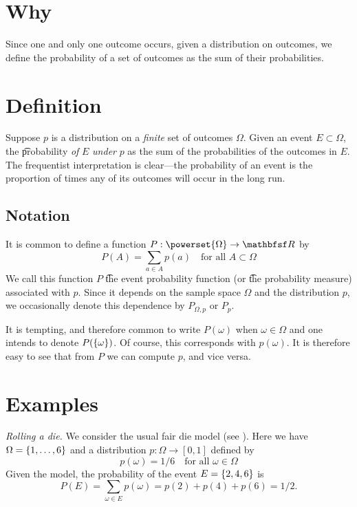 
\section*{Why}

Since one and only one outcome occurs, given a distribution on outcomes, we define the probability of a set of outcomes as the sum of their probabilities.

\section*{Definition}

Suppose $p$ is a distribution on a \textit{finite} set of outcomes $\Omega $.
Given an event $E \subset \Omega $, the \t{probability} \textit{of} $E$ \textit{under} $p$ as the sum of the probabilities of the outcomes in $E$.
The frequentist interpretation is clear---the probability of an event is the proportion of times any of its outcomes will occur in the long run.

\subsection*{Notation}

It is common to define a function $P: \powerset{\Omega } \to \R $ by
\[
P(A) = \sum_{a \in A} p(a) \quad \text{for all } A \subset \Omega
\]
We call this function $P$ \t{the event probability function} (or \t{the probability measure}) associated with $p$.
Since it depends on the sample space $\Omega $ and the distribution $p$, we occasionally denote this dependence by $P_{\Omega , p}$ or $P_p$.

It is tempting, and therefore common to write $P(\omega )$ when $\omega  \in \Omega $ and one intends to denote $P(\{\omega \})$.
Of course, this corresponds with $p(\omega )$.
It is therefore easy to see that from $P$ we can compute $p$, and vice versa.

\section*{Examples}

\textit{Rolling a die.}
We consider the usual fair die model (see ).
Here we have $\Omega  = \{1, \dots , 6\}$ and a distribution $p: \Omega  \to [0,1]$ defined by
\[
p(\omega ) = 1/6 \quad \text{for all } \omega  \in \Omega
\]
Given the model, the probability of the event $E = \{2, 4, 6\}$ is
\[
\textstyle
P(E) = \sum_{\omega  \in E} p(\omega ) = p(2) + p(4) + p(6) = 1/2.
\]

